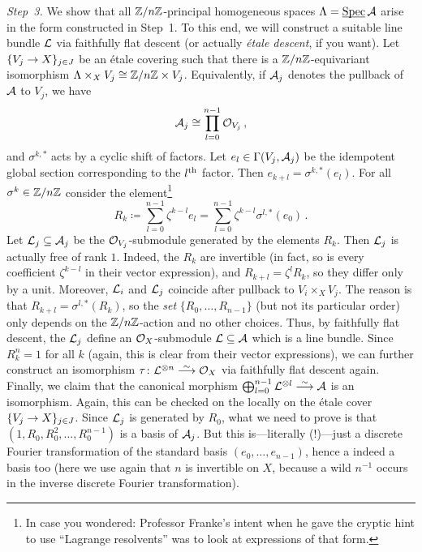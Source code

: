 \begin{proof*}
	\emph{Step~3.} We show that all $\mathbb{Z}/n\mathbb{Z}$-principal homogeneous spaces $\Lambda=\operatorname{\underline{\smash{\mathrm{Spec}}}}\mathcal{A}$ arise in the form constructed in Step~1. To this end, we will construct a suitable line bundle $\mathcal{L}$ via faithfully flat descent (or actually \emph{étale descent}, if you want). Let $\{V_j\morphism X\}_{j\in J}$ be an étale covering such that there is a $\mathbb{Z}/n\mathbb{Z}$-equivariant isomorphism $\Lambda\times_XV_j\cong \mathbb{Z}/n\mathbb{Z}\times V_j$. Equivalently, if $\mathcal{A}_j$ denotes the pullback of $\mathcal{A}$ to $V_j$, we have
	\begin{equation*}
		\mathcal{A}_j\cong \prod_{l=0}^{n-1}\mathcal{O}_{V_j}\,,
	\end{equation*}
	and $\sigma^{k,*}$ acts by a cyclic shift of factors. Let $e_l\in \operatorname{\Gamma}(V_j,\mathcal{A}_j)$ be the idempotent global section corresponding to the $l^{\text{th}}$ factor. Then $e_{k+l}=\sigma^{k,*}(e_l)$. For all $\sigma^k\in \mathbb{Z}/n\mathbb{Z}$ consider the element\footnote{In case you wondered: Professor Franke's intent when he gave the cryptic hint to use \enquote{Lagrange resolvents} was to look at expressions of that form.}
	\begin{equation*}
		R_k\coloneqq\sum_{l=0}^{n-1}\zeta^{k-l}e_l=\sum_{l=0}^{n-1}\zeta^{k-l}\sigma^{l,*}(e_0)\,.
	\end{equation*}
	Let $\mathcal{L}_j\subseteq \mathcal{A}_j$ be the $\mathcal{O}_{V_j}$-submodule generated by the elements $R_k$. Then $\mathcal{L}_j$ is actually free of rank $1$. Indeed, the $R_k$ are invertible (in fact, so is every coefficient $\zeta^{k-l}$ in their vector expression), and $R_{k+l}=\zeta^lR_k$, so they differ only by a unit. Moreover, $\mathcal{L}_i$ and $\mathcal{L}_j$ coincide after pullback to $V_i\times_XV_j$. The reason is that $R_{k+l}=\sigma^{l,*}(R_k)$, so the \emph{set} $\{R_0,\dotsc, R_{n-1}\}$ (but not its particular order) only depends on the $\mathbb{Z}/n\mathbb{Z}$-action and no other choices. Thus, by faithfully flat descent, the $\mathcal{L}_j$ define an $\mathcal{O}_X$-submodule $\mathcal{L}\subseteq \mathcal{A}$ which is a line bundle. Since $R_k^n=1$ for all $k$ (again, this is clear from their vector expressions), we can further construct an isomorphism  $\tau\colon\Ll^{\otimes n}\isomorphism \Oo_X$ via faithfully flat descent again. Finally, we claim that the canonical morphism $\bigoplus_{l=0}^{n-1}\Ll^{\otimes l}\isomorphism \Aa$ is an isomorphism. Again, this can be checked on the locally on the étale cover $\{V_j\morphism X\}_{j\in J}$. Since $\mathcal{L}_j$ is generated by $R_0$, what we need to prove is that $(1,R_0,R_0^2,\dotsc,R_0^{n-1})$ is a basis of $\mathcal{A}_j$. But this is---literally (!)---just a discrete Fourier transformation of the standard basis $(e_0,\dotsc,e_{n-1})$, hence a indeed a basis too (here we use again that $n$ is invertible on $X$, because a wild $n^{-1}$ occurs in the inverse discrete Fourier transformation).
	

\end{proof*}
